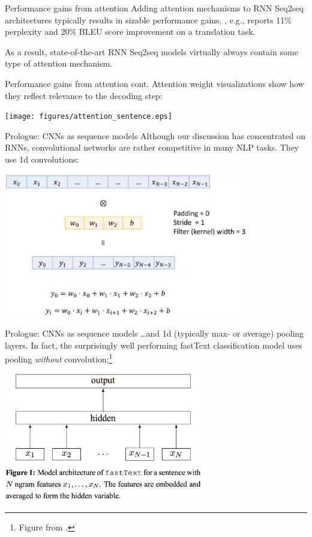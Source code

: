 \documentclass[style=upen, size=14pt]{powerdot}
\newcommand{\gold}{\color{arany}}
\theoremstyle{definition}
\begin{document}
\begin{slide}[toc=]{Performance gains from attention} Adding attention
  mechanisms to RNN Seq2seq architectures typically results in sizable
  performance gains, \citet[63]{luong2016neural}, e.g., reports 11\% perplexity
  and 20\% BLEU score improvement on a translation task.\bigskip

  As a result, state-of-the-art RNN Seq2seq models virtually always contain some
  type of attention mechanism.
\end{slide}

\begin{slide}[toc=]{Performance gains from attention cont.}
  Attention weight visualizations show how they reflect relevance to the decoding step:
  \begin{center}
    \texttt{[image: figures/attention\_sentence.eps]}
  \end{center}
\end{slide}


\begin{slide}[toc=CNNs]{Prologue: CNNs as sequence models}
  Although our discussion has concentrated on RNNs, {\gold convolutional
    networks} are rather competitive in many NLP tasks. They use 1d
  convolutions:
  \begin{center}
    \includegraphics[width=0.8\textwidth]{figures/1d_conv.eps}
  \end{center}
\end{slide}

\begin{slide}[toc=]{Prologue: CNNs as sequence models}
  \dots and 1d (typically max- or average) pooling layers. In fact, the surprisingly
  well performing {\gold fastText} classification model uses pooling
  \emph{without} convolution:\footnote{Figure from \cite{joulin2016bag}.}
  \begin{center}
    \includegraphics[width=0.65\textwidth]{figures/fastext.eps}
  \end{center}
\end{slide}
\end{document}
